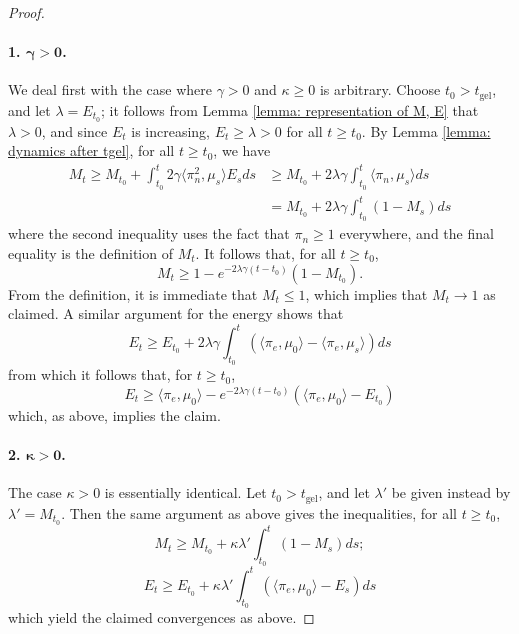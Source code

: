 \begin{proof}
\paragraph{1. $\mathbf{\gamma>0}$.} We deal first with the case where $\gamma>0$ and $\kappa \ge 0$ is arbitrary. Choose $t_0>t_\text{gel}$, and let $\lambda=E_{t_0}$; it follows from Lemma \ref{lemma: representation of M, E} that $\lambda>0$, and since $E_t$ is increasing, $E_t\ge \lambda>0$ for all $t\ge t_0$. By Lemma \ref{lemma: dynamics after tgel}, for all $t\ge t_0$, we have \begin{equation} \begin{split} M_t\ge M_{t_0}+\int_{t_0}^t 2\gamma \langle \pi_n^2, \mu_s\rangle E_s ds & \ge M_{t_0}+2\lambda \gamma \int_{t_0}^t \langle \pi_n, \mu_s\rangle ds \\ & = M_{t_0}+2\lambda \gamma \int_{t_0}^t (1-M_s)ds\end{split}  \end{equation} where the second inequality uses the fact that $\pi_n \ge 1$ everywhere, and the final equality is the definition of $M_t$. It follows that, for all $t\ge t_0$, \begin{equation} M_t \ge 1-e^{-2\lambda \gamma (t-t_0)}(1-M_{t_0}). \end{equation} From the definition, it is immediate that $M_t\le 1$, which implies that $M_t\rightarrow 1$ as claimed. A similar argument for the energy shows that \begin{equation} E_t \ge E_{t_0} + 2\lambda \gamma  \int_{t_0}^t(\langle \pi_e, \mu_0\rangle -\langle \pi_e, \mu_s\rangle)ds\end{equation} from which it follows that, for $t\ge t_0$, \begin{equation} E_t\ge \langle \pi_e, \mu_0\rangle-e^{-2\lambda\gamma(t-t_0)}(\langle \pi_e, \mu_0\rangle - E_{t_0})  \end{equation}  which, as above, implies the claim.
\paragraph{2. $\mathbf{\kappa>0}$.} The case $\kappa>0$ is essentially identical. Let $t_0>t_\text{gel}$,  and let $\lambda'$ be given instead by $\lambda'=M_{t_0}$. Then the same argument as above gives the inequalities, for all $t\ge t_0$, \begin{equation} M_t \ge M_{t_0}+\kappa \lambda'\int_{t_0}^t (1-M_s)ds; \end{equation} \begin{equation}  E_t \ge E_{t_0}+\kappa \lambda'\int_{t_0}^t (\langle \pi_e, \mu_0\rangle-E_s)ds \end{equation} which yield the claimed convergences as above. \end{proof} 
